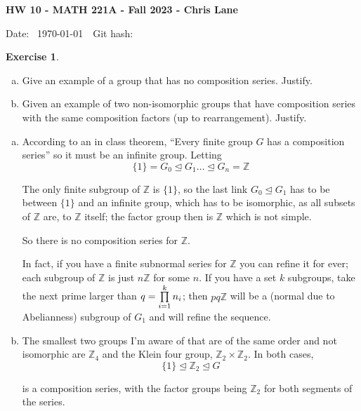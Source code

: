 \documentclass[11pt,oneside]{article}
\numberwithin{equation}{section}
\theoremstyle{definition}
\newtheorem{exercise}{Exercise}
\def\ZZ{\mathbb{Z}}
\begin{document}
\textbf{HW 10 - MATH 221A - Fall 2023 - Chris Lane}

Date: \hhmmsstime{} \ \today \ \ Git hash: 


\begin{exercise}
  \begin{enumerate}[(a)]
  \item
    Give an example of a group that has no composition series.  Justify.
  \item
    Given an example of two non-isomorphic groups that have composition series with the same
    composition factors (up to rearrangement).  Justify.  
  \end{enumerate}
\end{exercise}
  
\begin{solution}
  \begin{enumerate}[(a)]
  \item
    According to an in class theorem, ``Every finite group $G$ has a composition series'' so
    it must be an infinite group.  Letting
    \[
      \{1\} = G_0 \trianglelefteq G_1 \hdots  \trianglelefteq G_n = \ZZ
    \]

    The only finite subgroup of $\ZZ$ is $\{ 1 \}$, so the last link
    $G_0 \trianglelefteq G_1$ has to be between $\{ 1 \}$ and an
  infinite group, which has to be isomorphic, as all subsets of $\ZZ$
  are, to $\ZZ$ itself; the factor group then is $\ZZ$ which is not
  simple.

  So there is no composition series for $\ZZ$.

  In fact, if you have a finite subnormal series for $\ZZ$ you can
  refine it for ever; each subgroup of $\ZZ$ is just $n\ZZ$ for some
  $n$.  If you have a set $k$ subgroups, take the next prime larger
  than $ q = \prod \limits _ {i=1} ^ k n_i \\$; then $ p q
  \ZZ$ will be a (normal due to Abelianness) subgroup of $G_1$ and
  will refine the sequence.
    
\item
  The smallest two groups I'm aware of that are of the same order
  and not isomorphic are $\ZZ_4$ and the Klein four group, $\ZZ_2 \times \ZZ_2$.  In both cases,
  \[
    \{ 1 \} \trianglelefteq \ZZ_2 \trianglelefteq G
  \]

  is a composition series, with the factor groups being $\ZZ_2$ for
  both segments of the series.
    
  \end{enumerate}
\end{solution}
\end{document}

